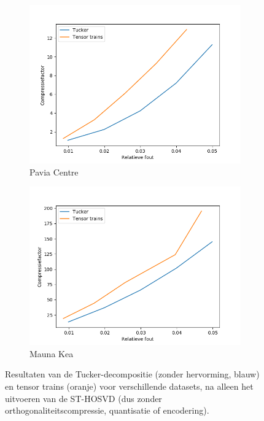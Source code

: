 \begin{figure}[]
\begin{subfigure}{0.48\textwidth}
  \includegraphics[width=\linewidth]{images/tensor_trains_st_hosvd_results_Pavia_Centre.png}
  \caption{Pavia Centre}
\end{subfigure}
\begin{subfigure}{0.48\textwidth}
  \centering
  \includegraphics[width=\linewidth]{images/tensor_trains_st_hosvd_results_Mauna_Kea.png}
  \caption{Mauna Kea}
\end{subfigure}
\caption{Resultaten van de Tucker-decompositie (zonder hervorming, blauw) en tensor trains (oranje) voor verschillende datasets, na alleen het uitvoeren van de ST-HOSVD (dus zonder orthogonaliteitscompressie, quantisatie of encodering).}
\label{fig:tensor_trains_st_hosvd_results}
\end{figure}

